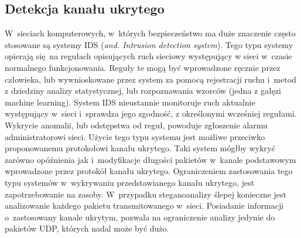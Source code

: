 \documentclass[a4paper, twoside, 12pt]{report}
\begin{document}
       \subsection{Detekcja kanału ukrytego}
       W~sieciach komputerowych, w~których bezpieczeństwo ma duże znaczenie często
       stosowane są systemy IDS (\emph{and. Intrusion detection system}). Tego typu
       systemy opierają się na regułach opisujących ruch sieciowy występujący w
       sieci w~czasie normalnego funkcjonowania. Reguły te mogą być wprowadzone ręcznie
       przez człowieka, lub wywnioskowane przez system za pomocą rejestracji ruchu i~metod z dziedziny
       analizy statystycznej, lub rozpoznawania wzorców (jedna z gałęzi machine learning)\cite{IDSDESCRIPTION}.
       System IDS nieustannie monitoruje ruch aktualnie występujący w~sieci i~sprawdza
       jego zgodność, z określonymi wcześniej regułami. Wykrycie anomalii, lub odstępstwa
       od reguł, powoduje zgłoszenie alarmu administratorowi sieci. Użycie tego
       typu systemu jest możliwe przeciwko proponowanemu protokołowi kanału ukrytego.
       Taki system mógłby wykryć zarówno opóźnienia jak i~modyfikacje długości
       pakietów w~kanale podstawowym wprowadzone przez protokół kanału ukrytego.
       Ograniczeniem zastosowania tego typu systemów w~wykrywaniu przedstawianego kanału
       ukrytego, jest zapotrzebowanie na zasoby. W~przypadku steganoanalizy ślepej
       konieczne jest analizowanie każdego pakietu transmitowanego w~sieci. Posiadanie
       informacji o~zastosowany kanale ukrytym, pozwala na ograniczenie analizy jedynie
       do pakietów UDP, których nadal może być dużo.
\end{document}
